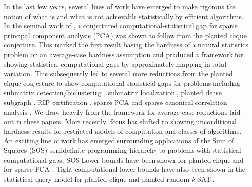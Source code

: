 In the last few years, several lines of work have emerged to make rigorous the notion of what is and what is not achievable statistically by efficient algorithms. In the seminal work of \cite{berthet2013complexity}, a conjectured computational-statistical gap for sparse principal component analysis (PCA) was shown to follow from the planted clique conjecture. This marked the first result basing the hardness of a natural statistics problem on an average-case hardness assumption and produced a framework for showing statistical-computational gaps by approximately mapping in total variation. This subsequently led to several more reductions from the planted clique conjecture to show computational-statistical gaps for problems including submatrix detection/biclustering \cite{ma2015computational}, submatrix localization \cite{cai2015computational}, planted dense subgraph \cite{hajek2015computational}, RIP certification \cite{wang2016average}, sparse PCA and sparse canonical correlation analysis \cite{wang2016statistical, gao2017sparse}. We draw heavily from the framework for average-case reductions laid out in these papers. More recently, focus has shifted to showing unconditional hardness results for restricted models of computation and classes of algorithms. An exciting line of work has emerged surrounding applications of the Sum of Squares (SOS) semidefinite programming hierarchy to problems with statistical computational gaps. SOS Lower bounds have been shown for planted clique \cite{barak2016nearly} and for sparse PCA \cite{krauthgamer2015semidefinite, ma2015sum, hopkins2017power}. Tight computational lower bounds have also been shown in the statistical query model for planted clique and planted random $k$-SAT \cite{feldman2012statistical, feldman2015complexity}.

